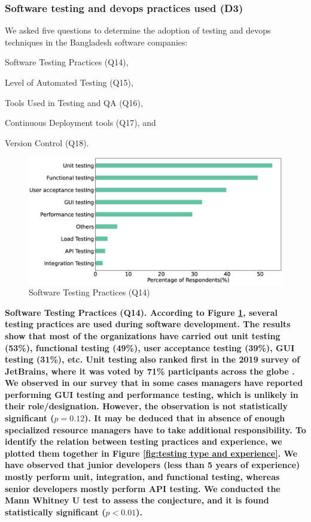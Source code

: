 \subsubsection{Software testing and devops practices used (D3)}
\label{testing_practices}
% 
We asked five questions to determine the adoption of testing and devops techniques in the Bangladesh software companies:
\begin{inparaenum}
\item Software Testing Practices (Q14),
\item Level of Automated Testing (Q15),
\item Tools Used in Testing and QA (Q16),
\item Continuous Deployment tools (Q17), and
\item Version Control (Q18).
\end{inparaenum}

\begin{figure}[h]
\centering
  \includegraphics[scale=0.2]{Figures/Respondents_testing_practices}
  \caption{Software Testing Practices (Q14)}
  \label{fig:testing}
\end{figure}
\bf{Software Testing Practices (Q14)}. According to Figure \ref{fig:testing}, several testing practices are used during
software development. The results show that most of the organizations have
carried out unit testing (53\%), functional testing (49\%), user acceptance
testing (39\%), GUI testing (31\%), etc. Unit testing also ranked first in the
2019 survey of JetBrains, where it was voted by 71\% participants across the
globe \citep{JetBrains2019}. We observed in our survey that in some cases
managers have reported performing GUI testing and performance testing, which is
unlikely in their role/designation. However, the observation is not
statistically significant ($p=0.12$). It may be deduced that in absence of
enough specialized resource managers have to take additional responsibility. To
identify the relation between testing practices and experience, we plotted them
together in Figure \ref{fig:testing type and experience}. We have observed that
junior developers (less than 5 years of experience) mostly perform unit, integration, and functional testing,
whereas senior developers mostly perform API testing. We conducted the Mann
Whitney U test to assess the conjecture, and it is found statistically
significant ($p<0.01$).

